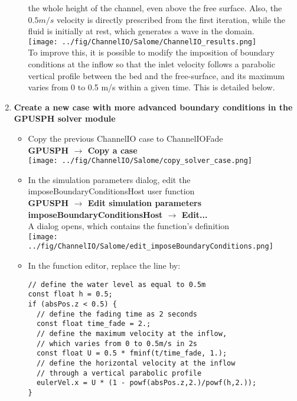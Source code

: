\documentclass{../GPUSPHtemplate}
\begin{document}
\begin{enumerate}
\begin{itemize}
    the whole height of the channel, even above the free surface. Also, the $0.5m/s$ velocity is directly prescribed
    from the first iteration, while the fluid is initially at rest, which generates a wave in the domain.\\
    \texttt{[image: ../fig/ChannelIO/Salome/ChannelIO\_results.png]}\medskip\\
    To improve this, it is possible to modify the imposition of boundary conditions at the inflow so that the inlet velocity
    follows a parabolic vertical profile between the bed and the free-surface, and its maximum varies from 0 to 0.5 m/s
    within a given time. This is detailed below. 
  \end{itemize}
\item \textbf{Create a new case with more advanced boundary conditions in the GPUSPH solver module}
  \begin{itemize}
  \item Copy the previous ChannelIO case to ChannelIOFade\\
    \textbf{GPUSPH $\to$ Copy a case}\smallskip\\
    \texttt{[image: ../fig/ChannelIO/Salome/copy\_solver\_case.png]}
  \item In the simulation parameters dialog, edit the imposeBoundaryConditionsHost user function\\
    \textbf{GPUSPH $\to$ Edit simulation parameters}\\
    \textbf{imposeBoundaryConditionsHost $\to$ Edit...}\\
    A dialog opens, which contains the function's definition\smallskip\\
    \texttt{[image: ../fig/ChannelIO/Salome/edit\_imposeBoundaryConditions.png]}\medskip
  \item In the function editor, replace the line  by:
    \begin{lstlisting}
// define the water level as equal to 0.5m
const float h = 0.5;
if (absPos.z < 0.5) {
  // define the fading time as 2 seconds
  const float time_fade = 2.;
  // define the maximum velocity at the inflow,
  // which varies from 0 to 0.5m/s in 2s
  const float U = 0.5 * fminf(t/time_fade, 1.);
  // define the horizontal velocity at the inflow
  // through a vertical parabolic profile
  eulerVel.x = U * (1 - powf(absPos.z,2.)/powf(h,2.));
}
    \end{lstlisting}

\end{itemize}
\end{enumerate}
\end{document}
